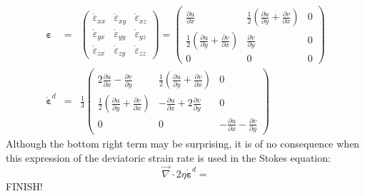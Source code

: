 \begin{eqnarray}
{\bm \varepsilon}&=&
\left(
\begin{array}{ccc}
\dot\varepsilon_{xx} & \dot\varepsilon_{xy} & \dot\varepsilon_{xz} \\ 
\dot\varepsilon_{yx} & \dot\varepsilon_{yy} & \dot\varepsilon_{yz} \\ 
\dot\varepsilon_{zx} & \dot\varepsilon_{zy} & \dot\varepsilon_{zz} 
\end{array}
\right)
=
\left(
\begin{array}{ccc}
\frac{\partial u}{\partial x} & \frac{1}{2}\left(\frac{\partial u}{\partial y} + \frac{\partial v}{\partial x}\right)  & 0 \\
\frac{1}{2}\left(\frac{\partial u}{\partial y} + \frac{\partial v}{\partial x}\right)  &  \frac{\partial v}{\partial y} & 0 \\
0 & 0 & 0
\end{array}
\right) \\
\dot{\bm \varepsilon}^d &=&
\frac{1}{3}
\left(
\begin{array}{ccc}
2 \frac{\partial u}{\partial x} - \frac{\partial v}{\partial y} &  
 \frac{1}{2}\left(\frac{\partial u}{\partial y} + \frac{\partial v}{\partial x}\right) &
0 \\ 
 \frac{1}{2}\left(\frac{\partial u}{\partial y} + \frac{\partial v}{\partial x}\right) &
- \frac{\partial u}{\partial x} +2 \frac{\partial v}{\partial y} &  
0 \\ 
0 & 0 & -\frac{\partial u}{\partial x} - \frac{\partial v}{\partial y}
\end{array}
\right)
\end{eqnarray}
Although the bottom right term may be surprising, it is of no consequence when this expression of the deviatoric strain rate is used in the Stokes equation:
\[
{\vec \nabla} \cdot 2\eta \dot{\bm \varepsilon}^d
=
\]
{\color{red} FINISH!}

